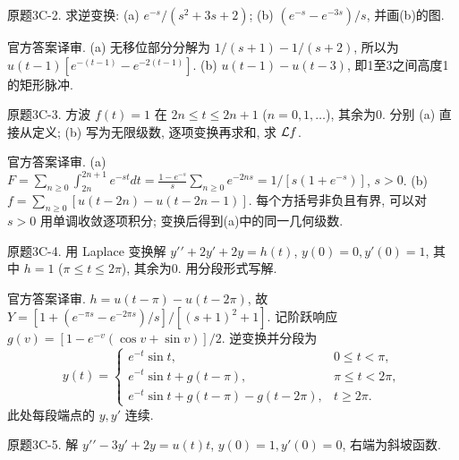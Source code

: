 \begin{exercise}\label{cw:bank-3C-2}
原题3C-2. 求逆变换: (a) $e^{-s}/(s^2+3s+2)$; (b) $(e^{-s}-e^{-3s})/s$, 并画(b)的图.
\end{exercise}
\begin{solution}
官方答案译审. (a) 无移位部分分解为 $1/(s+1)-1/(s+2)$, 所以为 $u(t-1)[e^{-(t-1)}-e^{-2(t-1)}]$. (b) $u(t-1)-u(t-3)$, 即1至3之间高度1的矩形脉冲.\begin{center}\end{center}
\end{solution}
\begin{exercise}\label{cw:bank-3C-3}
原题3C-3. 方波 $f(t)=1$ 在 $2n\le t\le2n+1$ ($n=0,1,\ldots$), 其余为0. 分别 (a) 直接从定义; (b) 写为无限级数, 逐项变换再求和, 求 $\mathcal L f$.
\end{exercise}
\begin{solution}
官方答案译审. (a) $F=\sum_{n\ge0}\int_{2n}^{2n+1}e^{-st}dt=\frac{1-e^{-s}}s\sum_{n\ge0}e^{-2ns}=1/[s(1+e^{-s})]$, $s>0$. (b) $f=\sum_{n\ge0}[u(t-2n)-u(t-2n-1)]$. 每个方括号非负且有界, 可以对 $s>0$ 用单调收敛逐项积分; 变换后得到(a)中的同一几何级数.
\end{solution}
\begin{exercise}\label{cw:bank-3C-4}
原题3C-4. 用 Laplace 变换解 $y\prime\prime+2y\prime+2y=h(t)$, $y(0)=0,y\prime(0)=1$, 其中 $h=1$ ($\pi\le t\le2\pi$), 其余为0. 用分段形式写解.
\end{exercise}
\begin{solution}
官方答案译审. $h=u(t-\pi)-u(t-2\pi)$, 故 $Y=[1+(e^{-\pi s}-e^{-2\pi s})/s]/[(s+1)^2+1]$. 记阶跃响应 $g(v)=[1-e^{-v}(\cos v+\sin v)]/2$. 逆变换并分段为\[y(t)=\begin{cases}e^{-t}\sin t,&0\le t<\pi,\\e^{-t}\sin t+g(t-\pi),&\pi\le t<2\pi,\\e^{-t}\sin t+g(t-\pi)-g(t-2\pi),&t\ge2\pi.\end{cases}\]此处每段端点的 $y,y\prime$ 连续.
\end{solution}
\begin{exercise}\label{cw:bank-3C-5}
原题3C-5. 解 $y\prime\prime-3y\prime+2y=u(t)t$, $y(0)=1,y\prime(0)=0$, 右端为斜坡函数.
\end{exercise}
